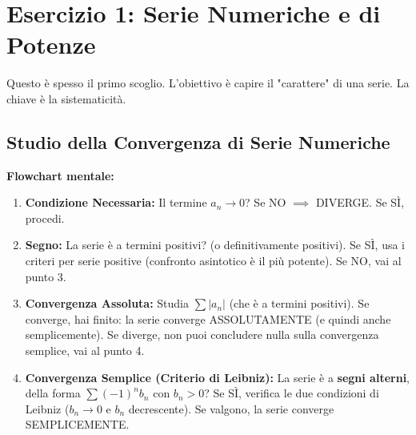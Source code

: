 \section{Esercizio 1: Serie Numeriche e di Potenze}
Questo è spesso il primo scoglio. L'obiettivo è capire il "carattere" di una serie. La chiave è la sistematicità.

\subsection{Studio della Convergenza di Serie Numeriche}
\begin{strategia}
\textbf{Flowchart mentale:}
\begin{enumerate}
    \item \textbf{Condizione Necessaria:} Il termine $a_n \to 0$? Se NO $\implies$ DIVERGE. Se SÌ, procedi. 
    \item \textbf{Segno:} La serie è a termini positivi? (o definitivamente positivi). Se SÌ, usa i criteri per serie positive (confronto asintotico è il più potente). Se NO, vai al punto 3. 
    \item \textbf{Convergenza Assoluta:} Studia $\sum |a_n|$ (che è a termini positivi). Se converge, hai finito: la serie converge ASSOLUTAMENTE (e quindi anche semplicemente). Se diverge, non puoi concludere nulla sulla convergenza semplice, vai al punto 4. 
    \item \textbf{Convergenza Semplice (Criterio di Leibniz):} La serie è a \textbf{segni alterni}, della forma $\sum (-1)^n b_n$ con $b_n>0$? Se SÌ, verifica le due condizioni di Leibniz ($b_n \to 0$ e $b_n$ decrescente). Se valgono, la serie converge SEMPLICEMENTE. 
\end{enumerate}
\end{strategia}

